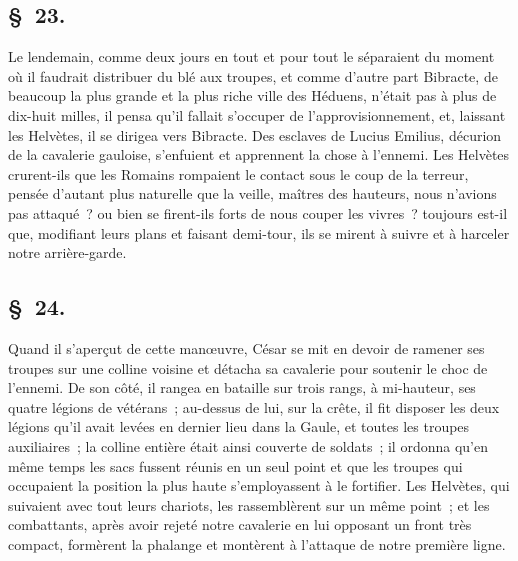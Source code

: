 \documentclass[french,twoside]{book} %
\begin{document}
\subsection[{§ 23.}]{ \textsc{§ 23.} }
\noindent Le lendemain, comme deux jours en tout et pour tout le séparaient du moment où il faudrait distribuer du blé aux troupes, et comme d’autre part Bibracte, de beaucoup la plus grande et la plus riche ville des Héduens, n’était pas à plus de dix-huit milles, il pensa qu’il fallait s’occuper de l’approvisionnement, et, laissant les Helvètes, il se dirigea vers Bibracte. Des esclaves de Lucius Emilius, décurion de la cavalerie gauloise, s’enfuient et apprennent la chose à l’ennemi. Les Helvètes crurent-ils que les Romains rompaient le contact sous le coup de la terreur, pensée d’autant plus naturelle que la veille, maîtres des hauteurs, nous n’avions pas attaqué ? ou bien se firent-ils forts de nous couper les vivres ? toujours est-il que, modifiant leurs plans et faisant demi-tour, ils se mirent à suivre et à harceler notre arrière-garde.
\subsection[{§ 24.}]{ \textsc{§ 24.} }
\noindent Quand il s’aperçut de cette manœuvre, César se mit en devoir de ramener ses troupes sur une colline voisine et détacha sa cavalerie pour soutenir le choc de l’ennemi. De son côté, il rangea en bataille sur trois rangs, à mi-hauteur, ses quatre légions de vétérans ; au-dessus de lui, sur la crête, il fit disposer les deux légions qu’il avait levées en dernier lieu dans la Gaule, et toutes les troupes auxiliaires ; la colline entière était ainsi couverte de soldats ; il ordonna qu’en même temps les sacs fussent réunis en un seul point et que les troupes qui occupaient la position la plus haute s’employassent à le fortifier. Les Helvètes, qui suivaient avec tout leurs chariots, les rassemblèrent sur un même point ; et les combattants, après avoir rejeté notre cavalerie en lui opposant un front très compact, formèrent la phalange et montèrent à l’attaque de notre première ligne.
\end{document}
